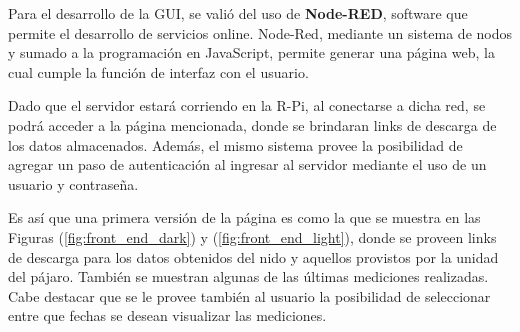 Para el desarrollo de la GUI, se valió del uso de \textbf{Node-RED}, software que permite el desarrollo de servicios online. Node-Red, mediante un sistema de nodos y sumado a la programación en JavaScript, permite generar una página web, la cual cumple la función de interfaz con el usuario.

Dado que el servidor estará corriendo en la R-Pi, al conectarse a dicha red, se podrá acceder a la página mencionada, donde se brindaran links de descarga de los datos almacenados. Además, el mismo sistema provee la posibilidad de agregar un paso de autenticación al ingresar al servidor mediante el uso de un usuario y contraseña. 

Es así que una primera versión de la página es como la que se muestra en las Figuras (\ref{fig:front_end_dark}) y (\ref{fig:front_end_light}), donde se proveen links de descarga para los datos obtenidos del nido y aquellos provistos por la unidad del pájaro. También se muestran algunas de las últimas mediciones realizadas. Cabe destacar que se le provee también al usuario la posibilidad de seleccionar entre que fechas se desean visualizar las mediciones.

